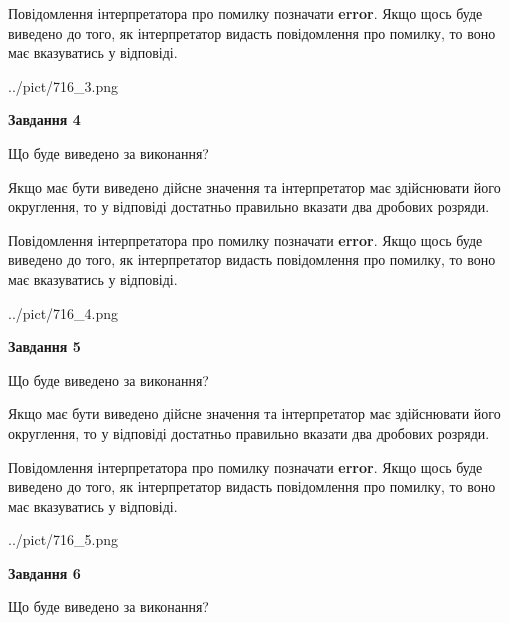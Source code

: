 \documentclass[12pt, ukrainian]{article}
\begin{document}
{\begin {Large}
Повідомлення інтерпретатора про помилку позначати \textbf{error}.
Якщо щось буде виведено до того, як інтерпретатор видасть повідомлення про помилку, 
то воно має вказуватись у відповіді. \par

\begin{center}
	{../pict/716_3.png}
\end{center}
\newpage

{\begin {center}\textbf{Завдання 4}\end {center}}\par
Що буде виведено за виконання? \par

Якщо має бути виведено дійсне значення та інтерпретатор має здійснювати його округлення, 
то у відповіді достатньо правильно вказати два дробових розряди.

Повідомлення інтерпретатора про помилку позначати \textbf{error}.
Якщо щось буде виведено до того, як інтерпретатор видасть повідомлення про помилку, 
то воно має вказуватись у відповіді. \par

\begin{center}
	{../pict/716_4.png}
\end{center}
\newpage

{\begin {center}\textbf{Завдання 5}\end {center}}\par
Що буде виведено за виконання? \par

Якщо має бути виведено дійсне значення та інтерпретатор має здійснювати його округлення, 
то у відповіді достатньо правильно вказати два дробових розряди.

Повідомлення інтерпретатора про помилку позначати \textbf{error}.
Якщо щось буде виведено до того, як інтерпретатор видасть повідомлення про помилку, 
то воно має вказуватись у відповіді. \par

\begin{center}
	{../pict/716_5.png}
\end{center}
\newpage

{\begin {center}\textbf{Завдання 6}\end {center}}\par
Що буде виведено за виконання? \par


\end{Large}}
\end{document}
